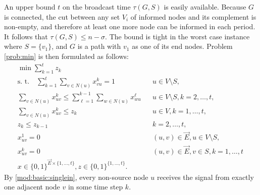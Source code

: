 An upper bound $t$ on the broadcast time $\tau(G,S)$ is easily available.
Because $G$ is connected, the cut between any set $V_i$ of informed nodes and its complement is non-empty,
and therefore at least one more node can be informed in each period.
It follows that $\tau(G,S)\leq n-\sigma$.
The bound is tight in the worst case instance where $S=\{v_1\}$, and $G$ is a path with $v_1$ as one of its end nodes.
Problem \ref{prob:min} is then formulated as follows: 
\begin{subequations}\label{mod:basic}
\begin{align}
\label{mod:basic:obj} \min \sum\limits_{k=1}^{t}z_k \\ 
\text{s. t.~~~} \label{mod:basic:singlein} \sum\limits_{k=1}^{t}\sum\limits_{v\in N(u)}x_{vu}^k  = 1 && u\in V \setminus S,\\
\label{mod:basic:tIncreases} \sum\limits_{v\in N(u)}x_{uv}^k \leq\sum\limits_{\ell=1}^{k-1}\sum\limits_{w\in N(u)} x_{wu}^{\ell}  && u\in V\setminus S, k=2,\dots,t,\\
\label{mod:basic:tcrel} \sum\limits_{v\in N(u)}x_{uv}^k  \leq z_k &&  u\in V,k=1,\dots,t,\\
\label{mod:basic:timing} z_k  \leq z_{k-1} &&  k=2,\dots,t,\\
\label{mod:basic:positiveCost}x_{uv}^1  = 0 && (u,v)\in \overrightarrow{E}, u \in V\setminus S,\\
\label{mod:basic:dec:0toSource} x_{uv}^k  = 0  && (u,v)\in\overrightarrow{E}, v\in S, k=1,\ldots,t\\
\label{mod:basic:dim}x \in \{0,1\}^{\overrightarrow{E}\times \{1,\dots,t\}},z\in\{0,1\}^{\{1,\ldots,t\}}.&&
\end{align}~
\end{subequations}
By \eqref{mod:basic:singlein}, every non-source node $u$ receives the signal from exactly one adjacent node $v$ in some time step $k$.
